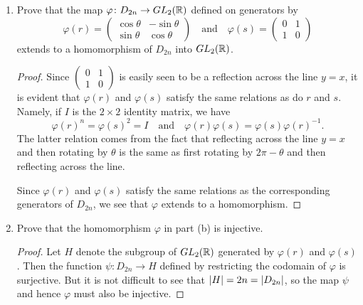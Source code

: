 \begin{enumerate}
\begin{proof}
    point $(x,y)$ under this transformation is the same point rotated
    about the origin by an angle of $\theta$.
  \end{proof}
\item Prove that the map $\varphi\colon D_{2n}\to GL_2(\mathbb{R})$ defined on
  generators by
  \begin{equation*}
    \varphi(r) =
    \begin{pmatrix}
      \cos\theta & -\sin\theta \\
      \sin\theta & \cos\theta
    \end{pmatrix}
    \quad\text{and}\quad
    \varphi(s) =
    \begin{pmatrix}
      0 & 1 \\
      1 & 0
    \end{pmatrix}
  \end{equation*}
  extends to a homomorphism of $D_{2n}$ into $GL_2(\mathbb{R})$.
  \begin{proof}
    Since $\begin{pmatrix} 0 & 1 \\ 1 & 0 \end{pmatrix}$ is easily
    seen to be a reflection across the line $y = x$, it is evident
    that $\varphi(r)$ and $\varphi(s)$ satisfy the same relations as
    do $r$ and $s$. Namely, if $I$ is the $2\times2$ identity matrix,
    we have
    \begin{equation*}
      \varphi(r)^n = \varphi(s)^2 = I
      \quad\text{and}\quad
      \varphi(r)\varphi(s) = \varphi(s)\varphi(r)^{-1}.
    \end{equation*}
    The latter relation comes from the fact that reflecting across the
    line $y = x$ and then rotating by $\theta$ is the same as first
    rotating by $2\pi - \theta$ and then reflecting across the line.

    Since $\varphi(r)$ and $\varphi(s)$ satisfy the same relations as
    the corresponding generators of $D_{2n}$, we see that $\varphi$
    extends to a homomorphism.
  \end{proof}
\item Prove that the homomorphism $\varphi$ in part (b) is injective.
  \begin{proof}
    Let $H$ denote the subgroup of $GL_2(\mathbb{R})$ generated by
    $\varphi(r)$ and $\varphi(s)$. Then the function
    $\psi\colon D_{2n}\to H$ defined by restricting the codomain of
    $\varphi$ is surjective. But it is not difficult to see that
    $\lvert{H}\rvert = 2n = \lvert{D_{2n}}\rvert$, so the map $\psi$ and hence
    $\varphi$ must also be injective.
  \end{proof}
\end{enumerate}

